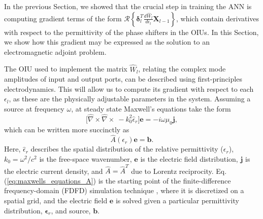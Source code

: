 
In the previous Section, we showed that the crucial step in training the ANN is computing gradient terms of the form  $\mathcal{R}\left\{\boldsymbol{\delta}_l^T \frac{d \hat{W}_l}{d\epsilon_l} \mathbf{X}_{l-1}\right\}$, which contain derivatives with respect to the permittivity of the phase shifters in the OIUs. In this Section, we show how this gradient may be expressed as the solution to an electromagnetic adjoint problem.

The OIU used to implement the matrix $\hat{W}_l$, relating the complex mode amplitudes of input and output ports, can be described using first-principles electrodynamics.  This will allow us to compute its gradient with respect to each $\epsilon_l$, as these are the physically adjustable parameters in the system. Assuming a source at frequency $\omega$, at steady state Maxwell's equations take the form 
\begin{equation}
\Big[ \hat{\nabla} \times \hat{\nabla} \times ~ -k_0^2 \hat{\epsilon}_r \Big]\mathbf{e} = -i\omega \mu_0 \mathbf{j},
\label{eq:maxwells_equations_physics}
\end{equation}
which can be written more succinctly as
\begin{equation}
\hat{A}(\epsilon_r) \mathbf{e} = \mathbf{b}
\label{eq:maxwells_equations_A}.
\end{equation}
Here, $\hat{\epsilon}_r$ describes the spatial distribution of the relative permittivity ($\epsilon_r$), $k_0=\omega^2/c^2$ is the free-space wavenumber, $\mathbf{e}$ is the electric field distribution, $\mathbf{j}$ is the electric current density, and $\hat{A} = \hat{A}^T$ due to Lorentz reciprocity. Eq. (\ref{eq:maxwells_equations_A}) is the starting point of the finite-difference frequency-domain (FDFD) simulation technique \cite{shin2012choice}, where it is discretized on a spatial grid, and the electric field $\mathbf{e}$ is solved given a particular permittivity distribution, $\boldsymbol{\epsilon}_r$, and source, $\mathbf{b}$.

